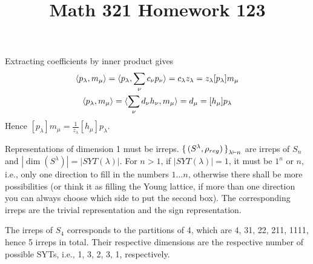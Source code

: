 \documentclass{myhw}
\title{Math 321 Homework 123}
\begin{document}
\begin{homeworkProblem}
Extracting coefficients by inner product gives
\begin{gather*}
\braket{p_\lambda,m_\mu}=\braket{p_\lambda,\sum_\nu c_\nu p_\nu}=c_\lambda z_\lambda=z_\lambda [p_\lambda]m_\mu \\
\braket{p_\lambda,m_\mu}=\braket{\sum_\nu d_\nu h_\nu, m_\mu}=d_\mu=[h_\mu]p_\lambda
\end{gather*}
Hence $[p_\lambda]m_\mu=\frac{1}{z_\lambda}[h_\mu]p_\lambda$.
\end{homeworkProblem}
\begin{homeworkProblem}
\begin{homeworkSection}
Representations of dimension 1 must be irreps. $\set{(S^\lambda, \rho_{reg})}_{\lambda \vdash n}$ are irreps of $S_n$ and $|\dim(S^\lambda)|=|SYT(\lambda)|$. For $n>1$, if $|SYT(\lambda)|=1$, it must be $1^n$ or $n$, i.e., only one direction to fill in the numbers $1 \ldots n$, otherwise there shall be more possibilities (or think it as filling the Young lattice, if more than one direction you can always choose which side to put the second box). The corresponding irreps are the trivial representation and the sign representation.
\end{homeworkSection}
\begin{homeworkSection}
The irreps of $S_4$ corresponds to the partitions of 4, which are 4, 31, 22, 211, 1111, hence 5 irreps in total. Their respective dimensions are the respective number of possible SYTs, i.e., 1, 3, 2, 3, 1, respectively.
\end{homeworkSection}
\end{homeworkProblem}
\end{document}

